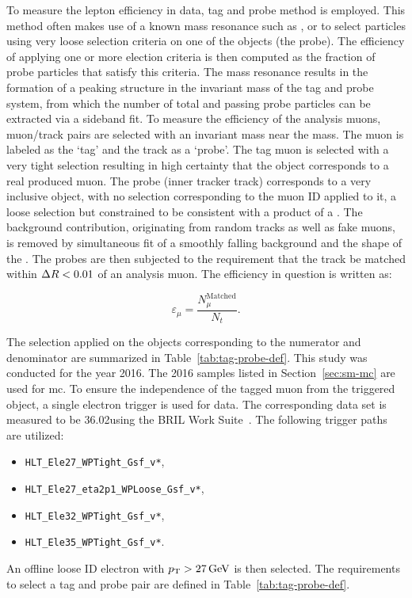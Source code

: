 To measure the lepton efficiency in data, tag and probe method is employed. This method often makes use of a known mass resonance such as \PZ, \JPsi or \PGU to select particles using very loose selection criteria on one of the objects (the probe). The efficiency of applying one or more election criteria is then computed as the fraction of probe particles that satisfy this criteria. The mass resonance results in the formation of a peaking structure in the invariant mass of the tag and probe system, from which the number of total and passing probe particles can be extracted via a sideband fit. To measure the efficiency of the analysis muons, muon/track pairs are selected with an invariant mass near the \JPsi mass. The muon is labeled as the `tag' and the track as a `probe'. The tag muon is selected with a very tight selection resulting in high certainty that the object corresponds to a real produced muon. The probe (inner tracker track) corresponds to a very inclusive object, with no selection corresponding to the muon ID applied to it, a loose selection but constrained to be consistent with a product of a \JPsi. The background contribution, originating from random tracks as well as fake muons, is removed by simultaneous fit of a smoothly falling background and the shape of the \JPsi. The probes are then subjected to the requirement that the track be matched within $\Delta R<0.01$ of an analysis muon. The efficiency in question is written as:

\begin{equation}
\varepsilon_{\mu} = \frac{N_{\mu}^\text{Matched}}{N_{t}}.
\end{equation}

The selection applied on the objects corresponding to the numerator and denominator are summarized in Table~\ref{tab:tag-probe-def}. This study was conducted for the year 2016. The 2016 samples listed in Section~\ref{sec:sm-mc} are used for \gls{mc}. To ensure the independence of the tagged muon from the triggered object, a single electron trigger is used for data. The corresponding data set is measured to be 36.02\fbinv using the BRIL Work Suite~\cite{bril}. The following trigger paths are utilized:
\begin{itemize}
\item \texttt{HLT\_Ele27\_WPTight\_Gsf\_v*},
\item \texttt{HLT\_Ele27\_eta2p1\_WPLoose\_Gsf\_v*},
\item \texttt{HLT\_Ele32\_WPTight\_Gsf\_v*},
\item \texttt{HLT\_Ele35\_WPTight\_Gsf\_v*}.
\end{itemize}
An offline loose ID electron with $p_{\mathrm{T}}>27\,\text{Ge\hspace{-.08em}V}$ is then selected. The requirements to select a tag and probe pair are defined in Table~\ref{tab:tag-probe-def}.


